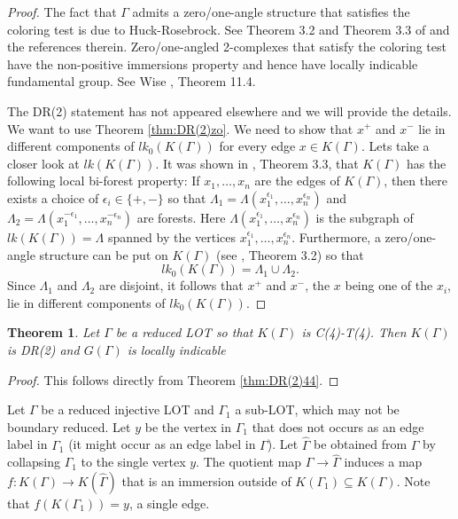 \documentclass[12pt]{amsart}
\newtheorem{thm}{Theorem}[section]
\theoremstyle{definition}
\begin{document}
\begin{proof}
The fact that $\Gamma$ admits a zero/one-angle structure that satisfies the coloring test is due to Huck-Rosebrock. See Theorem 3.2 and Theorem 3.3 of \cite{HarRose2022} and the references therein. Zero/one-angled 2-complexes that satisfy the coloring test have the non-positive immersions property and hence have locally indicable fundamental group.
See Wise \cite{Wise04}, Theorem 11.4.

The DR(2) statement has not appeared elsewhere and we will provide the details. We want to use Theorem \ref{thm:DR(2)zo}. We need to show that $x^+$ and $x^-$ lie in different components of $lk_0(K(\Gamma))$ for every edge $x\in K(\Gamma)$. Lets take a closer look at $lk(K(\Gamma))$.
It was shown in \cite{HarRose2022}, Theorem 3.3, that $K(\Gamma)$ has the following local bi-forest property: If $x_1,\ldots, x_n$ are the edges of $K(\Gamma)$, then there exists a choice of $\epsilon_i\in \{ +,-\}$ so that 
$\Lambda_1=\Lambda(x_1^{\epsilon_1},\ldots, x_n^{\epsilon_n})$ and $\Lambda_2=\Lambda(x_1^{-\epsilon_1},\ldots, x_n^{-\epsilon_n})$ are forests. Here $\Lambda(x_1^{\epsilon_1},\ldots, x_n^{\epsilon_n})$ is the subgraph of $lk(K(\Gamma))=\Lambda$ spanned by the vertices $x_1^{\epsilon_1},\ldots, x_n^{\epsilon_n}$. Furthermore, a zero/one-angle structure can be put on $K(\Gamma)$ (see \cite{HarRose2022}, Theorem 3.2) so that
$$lk_0(K(\Gamma))=\Lambda_1\cup\Lambda_2.$$ Since $\Lambda_1$ and $\Lambda_2$ are disjoint, it follows that $x^+$ and $x^-$, the $x$ being one of the $x_i$, lie in different components of $lk_0(K(\Gamma))$.
\end{proof}

\begin{thm}\label{thm:LOT44}
    Let $\Gamma$ be a reduced LOT so that $K(\Gamma)$ is C(4)-T(4). Then $K(\Gamma)$ is DR(2) and $G(\Gamma)$ is locally indicable
\end{thm}

\begin{proof}
    This follows directly from Theorem \ref{thm:DR(2)44}.
\end{proof}

Let $\Gamma$ be a reduced injective LOT and $\Gamma_1$ a sub-LOT, which may not be boundary reduced. Let $y$ be the vertex in $\Gamma_1$ that does not occurs as an edge label in $\Gamma_1$ (it might occur as an edge label in $\Gamma$). Let $\hat \Gamma$ be obtained from $\Gamma$ by collapsing $\Gamma_1$ to the single vertex $y$. The quotient map $\Gamma \to \hat \Gamma$ induces a map $f\colon K(\Gamma)\to K(\hat\Gamma)$ that is an immersion outside of $K(\Gamma_1)\subseteq K(\Gamma)$. Note that $f(K(\Gamma_1))=y$, a single edge.
\end{document}
